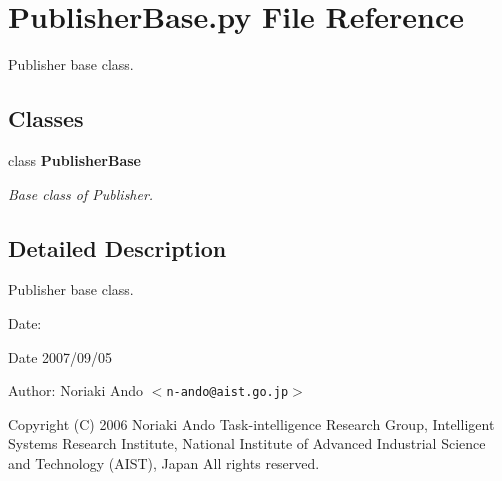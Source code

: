 \section{Publisher\-Base.py File Reference}
\label{PublisherBase_8py}
Publisher base class. 

\subsection*{Classes}
\begin{CompactItemize}
\item 
class {\bf Publisher\-Base}
\begin{CompactList}\small\item\em Base class of Publisher. \item\end{CompactList}\end{CompactItemize}


\subsection{Detailed Description}
Publisher base class. 

\begin{Desc}
\item[Date:]\begin{Desc}
\item[Date]2007/09/05\end{Desc}
\end{Desc}
\begin{Desc}
\item[Author:]Noriaki Ando $<${\tt n-ando@aist.go.jp}$>$\end{Desc}
Copyright (C) 2006 Noriaki Ando Task-intelligence Research Group, Intelligent Systems Research Institute, National Institute of Advanced Industrial Science and Technology (AIST), Japan All rights reserved.